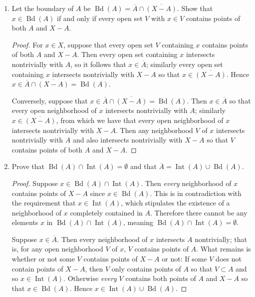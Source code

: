 \documentclass[11pt]{article}
\DeclareMathOperator{\Int}{Int}
\DeclareMathOperator{\Bd}{Bd}
\begin{document}
\begin{enumerate}
\begin{enumerate}[label=(\alph*)]
\begin{proof}
        Conversely, suppose that $x\in\Int(A)$. Then by definition of $\Int(A)$, it follows that $x$ is contained in some open set contained in $A$.
      \end{proof}
      \item Let the boundary of $A$ be $\Bd(A) = \overline{A}\cap \overline{(X-A)}$. Show that $x\in \Bd(A)$ if and only if every open set $V$ with $x\in V$ contains points of both $A$ and $X-A$.
      \begin{proof}
        For $x\in X$, suppose that every open set $V$ containing $x$ contains points of both $A$ and $X-A$. Then every open set containing $x$ intersects nontrivially with $A$, so it follows that $x\in \overline{A}$; similarly every open set containing $x$ intersects nontrivially with $X-A$ so that $x\in \overline{(X-A)}$. Hence $x\in \overline{A}\cap\overline{(X-A)} = \Bd(A)$.

        Conversely, suppose that $x\in \overline{A}\cap\overline{(X-A)} = \Bd(A)$. Then $x\in \overline{A}$ so that every open neighborhood of $x$ intersects nontrivially with $A$; similarly $x\in \overline{(X-A)}$, from which we have that every open neighborhood of $x$ intersects nontrivially with $X-A$. Then any neighborhood $V$ of $x$ intersects nontrivially with $A$ and also intersects nontrivially with $X-A$ so that $V$ contains points of both $A$ and $X-A$.
      \end{proof}
      \item Prove that $\Bd(A)\cap\Int(A) = \emptyset$ and that $\overline{A} = \Int(A)\cup\Bd(A)$.
      \begin{proof}
        Suppose $x\in \Bd(A)\cap\Int(A)$. Then \textit{every} neighborhood of $x$ contains points of $X-A$ since $x\in \Bd(A)$. This is in contradiction with the requirement that $x\in\Int(A)$, which stipulates the existence of a neighborhood of $x$ completely contained in $A$. Therefore there cannot be any elements $x$ in $\Bd(A)\cap\Int(A)$, meaning $\Bd(A)\cap\Int(A) = \emptyset$.

        Suppose $x\in \overline{A}$. Then every neighborhood of $x$ intersects $A$ nontrivially; that is, for any open neighborhood $V$ of $x$, $V$ contains points of $A$. What remains is whether or not some $V$ contains points of $X-A$ or not: If some $V$ does not contain points of $X-A$, then $V$ only contains points of $A$ so that $V\subset A$ and so $x\in \Int(A)$. Otherwise \textit{every} $V$ contains both points of $A$ and $X-A$ so that $x\in \Bd(A)$. Hence $x\in \Int(A)\cup\Bd(A)$.


\end{proof}
\end{enumerate}
\end{enumerate}
\end{document}
